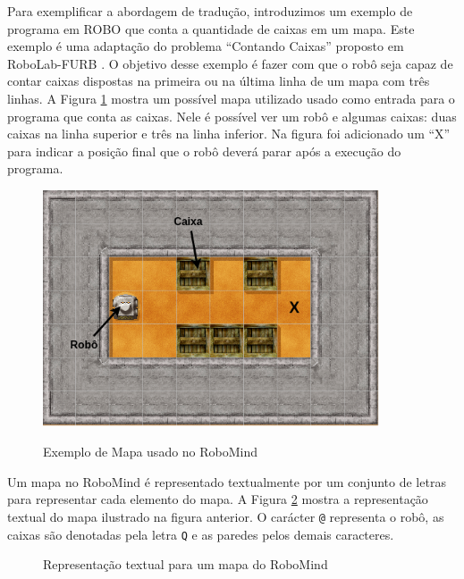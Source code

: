 Para exemplificar a abordagem de tradução, introduzimos um exemplo de programa em ROBO que conta a quantidade de caixas em um mapa. Este exemplo é uma adaptação do problema ``Contando Caixas'' proposto em RoboLab-FURB \cite{furb}. O objetivo desse exemplo é fazer com que o robô seja capaz de contar caixas dispostas na primeira ou na última linha de um mapa com três linhas.  A Figura \ref{fig:map} mostra um possível mapa utilizado usado como entrada para o programa que conta as caixas. Nele é possível ver um robô e algumas caixas: duas caixas na linha superior e três na linha inferior. Na figura foi adicionado um ``X'' para indicar a posição final que o robô deverá parar após a execução do programa. 

\begin{figure}[h]
\centering
\caption{Exemplo de Mapa usado no RoboMind}
\includegraphics[height=7cm]{figuras/map2.png}
\label{fig:map}
\end{figure}

Um mapa no RoboMind é representado textualmente por um conjunto de letras para representar cada elemento do mapa. A Figura \ref{fig:maprobo} mostra a representação textual do mapa ilustrado na figura anterior. O carácter \texttt{@} representa o robô, as caixas são denotadas pela letra \texttt{Q} e as paredes pelos demais caracteres.

\begin{figure}[h]
\centering
\caption{Representação textual para um mapa do RoboMind}

\label{fig:maprobo}
\end{figure}


